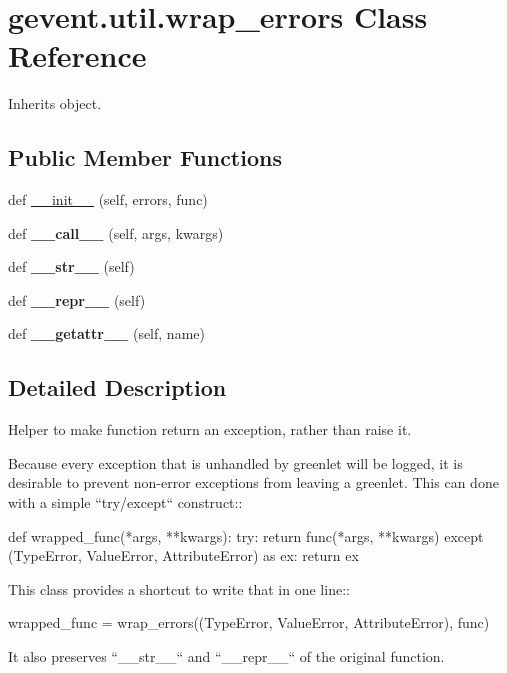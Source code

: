 \hypertarget{classgevent_1_1util_1_1wrap__errors}{}\section{gevent.\+util.\+wrap\+\_\+errors Class Reference}
\label{classgevent_1_1util_1_1wrap__errors}


Inherits object.

\subsection*{Public Member Functions}
\begin{DoxyCompactItemize}
\item 
def \hyperlink{classgevent_1_1util_1_1wrap__errors_ad69e6df9bdc02cf4005dbad8e1df7eb4}{\+\_\+\+\_\+init\+\_\+\+\_\+} (self, errors, func)
\item 
\mbox{\label{classgevent_1_1util_1_1wrap__errors_a91491c4c04cbc9e01e0f96d89322ef57}} 
def {\bfseries \+\_\+\+\_\+call\+\_\+\+\_\+} (self, args, kwargs)
\item 
\mbox{\label{classgevent_1_1util_1_1wrap__errors_ae09760b7d7364135d268251719def583}} 
def {\bfseries \+\_\+\+\_\+str\+\_\+\+\_\+} (self)
\item 
\mbox{\label{classgevent_1_1util_1_1wrap__errors_aa125b4aadfbce3e54bfa9cb0bd1e554d}} 
def {\bfseries \+\_\+\+\_\+repr\+\_\+\+\_\+} (self)
\item 
\mbox{\label{classgevent_1_1util_1_1wrap__errors_aa15330353a25257db700b454ec15aa7a}} 
def {\bfseries \+\_\+\+\_\+getattr\+\_\+\+\_\+} (self, name)
\end{DoxyCompactItemize}


\subsection{Detailed Description}
\begin{DoxyVerb}Helper to make function return an exception, rather than raise it.

Because every exception that is unhandled by greenlet will be logged,
it is desirable to prevent non-error exceptions from leaving a greenlet.
This can done with a simple ``try/except`` construct::

    def wrapped_func(*args, **kwargs):
        try:
            return func(*args, **kwargs)
        except (TypeError, ValueError, AttributeError) as ex:
            return ex

This class provides a shortcut to write that in one line::

    wrapped_func = wrap_errors((TypeError, ValueError, AttributeError), func)

It also preserves ``__str__`` and ``__repr__`` of the original function.
\end{DoxyVerb}
 

